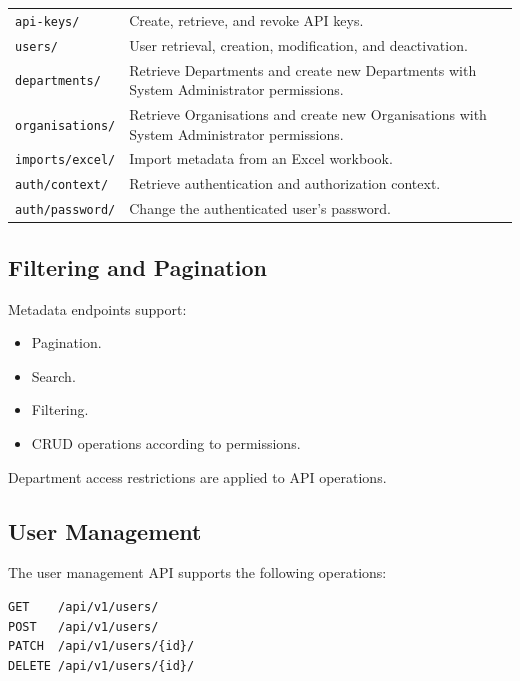 \documentclass[11pt,a4paper]{article}
\begin{document}
\begin{longtable}{P{6.3cm} P{8.8cm}}
\texttt{api-keys/} &
Create, retrieve, and revoke API keys. \\

\texttt{users/} &
User retrieval, creation, modification,
and deactivation. \\

\texttt{departments/} &
Retrieve Departments and create new Departments
with System Administrator permissions. \\

\texttt{organisations/} &
Retrieve Organisations and create new Organisations
with System Administrator permissions. \\

\texttt{imports/excel/} &
Import metadata from an Excel workbook. \\

\texttt{auth/context/} &
Retrieve authentication and authorization context. \\

\texttt{auth/password/} &
Change the authenticated user's password. \\

\end{longtable}

\subsection{Filtering and Pagination}

Metadata endpoints support:

\begin{itemize}
    \item Pagination.
    \item Search.
    \item Filtering.
    \item CRUD operations according to permissions.
\end{itemize}

Department access restrictions are applied
to API operations.

\subsection{User Management}

The user management API supports the following
operations:

\begin{lstlisting}
GET    /api/v1/users/
POST   /api/v1/users/
PATCH  /api/v1/users/{id}/
DELETE /api/v1/users/{id}/
\end{lstlisting}
\end{document}
